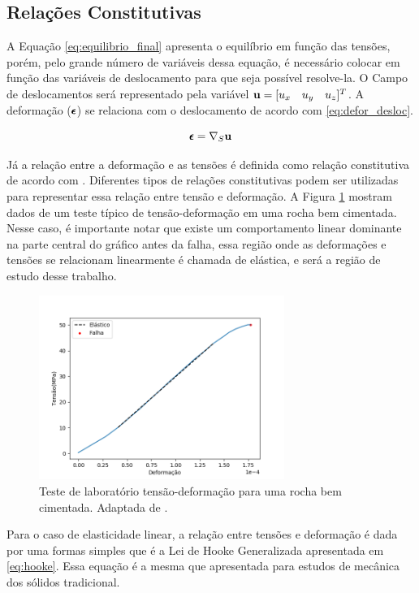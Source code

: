 \subsection{Relações Constitutivas}

A Equação \eqref{eq:equilibrio_final} apresenta o equilíbrio em função das tensões, porém, pelo grande número de variáveis dessa equação, é necessário colocar em função das variáveis de deslocamento para que seja possível resolve-la. O Campo de deslocamentos será representado pela variável $\mathbf{u} = [u_x \quad u_y \quad u_z]^T$. A deformação ($\pmb{\epsilon}$) se relaciona com o deslocamento de acordo com \eqref{eq:defor_desloc}. 

\begin{equation}
\label{eq:defor_desloc}
\pmb{\epsilon} = \nabla_S \mathbf{u}
\end{equation}


Já a relação entre a deformação e as tensões é definida como relação constitutiva de acordo com \citet{ResGeomec}. Diferentes tipos de relações constitutivas podem ser utilizadas para representar essa relação entre tensão e deformação. A Figura \ref{fig:stress_strain} mostram dados de um teste típico de tensão-deformação em uma rocha bem cimentada. Nesse caso, é importante notar que existe um comportamento linear dominante na parte central do gráfico antes da falha, essa região onde as deformações e tensões se relacionam linearmente é chamada de elástica, e será a região de estudo desse trabalho. %


\begin{figure}[!htbp]
\centering
\includegraphics[width=8cm]{chap01/figs/stress_strain.png}
\caption{Teste de laboratório tensão-deformação para uma rocha bem cimentada. Adaptada de \citet{ResGeomec}.}
\label{fig:stress_strain}
\end{figure}


Para o caso de elasticidade linear, a relação entre tensões e deformação é dada por uma formas simples  que é a Lei de Hooke Generalizada apresentada em \eqref{eq:hooke}. Essa equação é a mesma que apresentada para estudos de mecânica dos sólidos tradicional.

